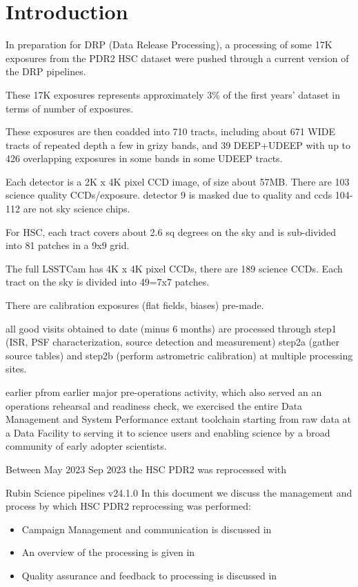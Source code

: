 \section{Introduction}\label{sec:intro}

In preparation for DRP (Data Release Processing), a processing of
some 17K exposures from the PDR2 HSC dataset were pushed through
a current version of the DRP pipelines.

These 17K exposures represents approximately 3\% of the first years' 
dataset in terms of number of exposures.

These exposures are then coadded into 710 tracts, including about 671
WIDE tracts of repeated depth a few in grizy bands, and 39 DEEP+UDEEP with
up to 426 overlapping exposures in some bands in some UDEEP tracts.

Each detector is a 2K x 4K pixel CCD image, of size about 57MB.
There are 103 science quality CCDs/exposure.  detector 9 is masked due
to quality and ccds 104-112 are not sky science chips.

For HSC, each tract covers about 2.6 sq degrees on the sky and is
sub-divided into 81 patches in a 9x9 grid.

The full LSSTCam has 4K x 4K pixel CCDs, there are 189 science CCDs.
Each tract on the sky is divided into 49=7x7 patches.

There are calibration exposures (flat fields, biases) pre-made.

all good visits obtained to date (minus 6 months) are processed 
through step1 (ISR, PSF characterization, source detection and 
measurement) step2a (gather source tables) and step2b (perform 
astrometric calibration) at multiple processing sites.

earlier pfrom earlier major pre-operations activity, which also served an an operations rehearsal and readiness check, we exercised the entire Data Management and System Performance extant toolchain starting from raw data at a Data Facility to serving it to science users and enabling science by a broad community of early adopter scientists. 

Between May 2023 Sep 2023 the HSC PDR2 was reprocessed with 

Rubin Science pipelines v24.1.0
In this document we discuss the management and process by which HSC PDR2 
reprocessing was performed:

\begin{itemize}
\item Campaign Management and communication is discussed in 
\item An overview of the processing is given in 
\item Quality assurance and feedback to processing is discussed in  
\end{itemize}

